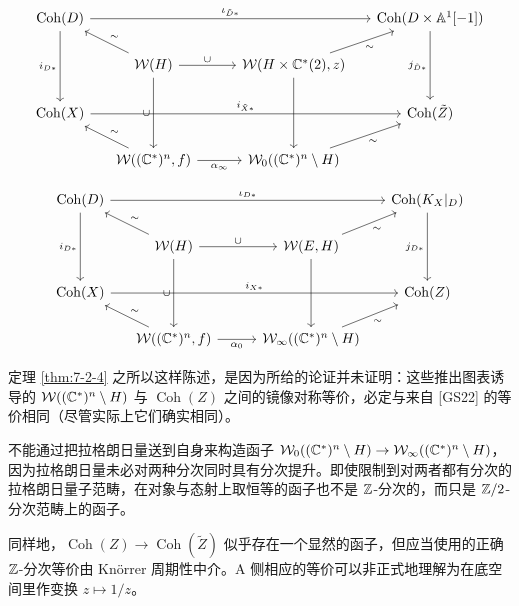 \[
\begin{tikzcd}[column sep=1.4em, row sep=1.6em]
\operatorname{Coh}(D) \arrow[rrrr, "\iota_{\tilde D*}"] \arrow[dd, "i_{D*}"'] & & & & \operatorname{Coh}(D\times\mathbb A^1[-1]) \arrow[dd, "j_{\tilde D*}"'] \\
& \cW(H) \arrow[rr, "\cup"] \arrow[dd, "\cup"'] \arrow[ul, "\sim"'] & & \cW(H\times\C^*(2),z) \arrow[ur, "\sim"'] \arrow[dd] & \\
\operatorname{Coh}(X) \arrow[rrrr, "i_{\tilde X*}"] & & & & \operatorname{Coh}(\tilde Z) \\
& \cW((\C^*)^n,f) \arrow[rr, "\alpha_\infty"'] \arrow[ul, "\sim"'] & & \cW_0((\C^*)^n\setminus H) \arrow[ur, "\sim"'] &
\end{tikzcd}
\]


\[
\begin{tikzcd}[column sep=1.4em, row sep=1.6em]
\operatorname{Coh}(D) \arrow[rrrr, "\iota_{D*}"] \arrow[dd, "i_{D*}"'] & & & & \operatorname{Coh}(K_X|_D) \arrow[dd, "j_{D*}"'] \\
& \cW(H) \arrow[rr, "\cup"] \arrow[dd, "\cup"'] \arrow[ul, "\sim"'] & & \cW(E,H) \arrow[ur, "\sim"'] \arrow[dd] & \\
\operatorname{Coh}(X) \arrow[rrrr, "i_{X*}"] & & & & \operatorname{Coh}(Z) \\
& \cW((\C^*)^n,f) \arrow[rr, "\alpha_0"'] \arrow[ul, "\sim"'] & & \cW_\infty((\C^*)^n\setminus H) \arrow[ur, "\sim"'] &
\end{tikzcd}
\]

\begin{remarkx}\label{rem:12}
定理 \ref{thm:7-2-4} 之所以这样陈述，是因为所给的论证并未证明：这些推出图表诱导的 $\mathcal{W}((\mathbb{C}^*)^n\setminus H)$ 与 $\operatorname{Coh}(Z)$ 之间的镜像对称等价，必定与来自 [GS22] 的等价相同（尽管实际上它们确实相同）。
\end{remarkx}

\begin{remarkx}\label{rem:13}
不能通过把拉格朗日量送到自身来构造函子 $\mathcal{W}_0((\mathbb{C}^*)^n\setminus H)\to\mathcal{W}_\infty((\mathbb{C}^*)^n\setminus H)$，因为拉格朗日量未必对两种分次同时具有分次提升。即使限制到对两者都有分次的拉格朗日量子范畴，在对象与态射上取恒等的函子也不是 $\mathbb{Z}$-分次的，而只是 $\mathbb{Z}/2$-分次范畴上的函子。

同样地，$\operatorname{Coh}(Z)\to\operatorname{Coh}(\tilde Z)$ 似乎存在一个显然的函子，但应当使用的正确 $\mathbb{Z}$-分次等价由 Kn{\"o}rrer 周期性中介。A 侧相应的等价可以非正式地理解为在底空间里作变换 $z\mapsto1/z$。
\end{remarkx}

